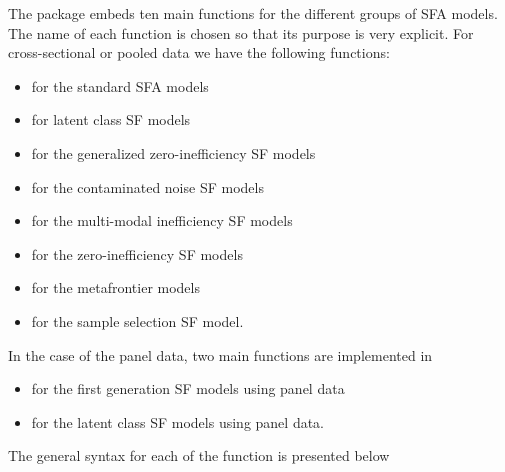 \documentclass[nojss]{jss}
\begin{document}
The  package embeds ten main functions for the different groups of SFA
models. The name of each function is chosen so that its purpose is very 
explicit. For cross-sectional or pooled data we have the following functions:
%
\begin{itemize} \itemsep 10pt
\item {} for the standard SFA models 
\item {} for latent class SF models
\item {} for the generalized zero-inefficiency SF models
\item {} for the contaminated noise SF models
\item {} for the multi-modal inefficiency SF models
\item {} for the zero-inefficiency SF models
\item {} for the metafrontier models
\item {} for the sample selection SF model.
\end{itemize}
%
In the case of the panel data, two main functions are implemented in  
%
\begin{itemize} \itemsep 10pt
\item {} for the first generation SF models using panel data
\item {} for the latent class SF models using panel data.
\end{itemize}
%
The general syntax for each of the function is presented below
\end{document}
